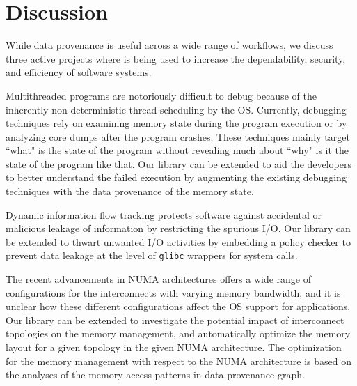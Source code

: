 \section{Discussion}
\label{sec:discussion}
While data provenance is useful across a wide range of workflows, we discuss three active projects where \projecttitle is being used to increase the dependability, security, and efficiency of software systems. 

 Multithreaded programs are notoriously difficult to debug because of the inherently non-deterministic thread scheduling by the OS.  Currently, debugging techniques rely on examining memory state during the program execution or by analyzing core dumps after the program crashes. These techniques mainly target ``what" is the state of the program without revealing much about ``why" is it the state of the program like that. Our library can be extended to aid the developers to better understand the failed execution by augmenting the existing debugging techniques with the data provenance of the memory state.


%
%
%


 Dynamic information flow tracking protects software against accidental or malicious leakage of information by restricting the spurious I/O. Our library can be extended to thwart unwanted I/O activities by embedding a policy checker to prevent data leakage at the level of {\tt glibc} wrappers for system calls.



 The recent advancements in NUMA architectures offers a wide range of configurations for the interconnects with varying memory bandwidth, and  it is unclear how these different configurations affect the OS support for applications. Our library can be extended to investigate the potential impact of interconnect topologies on the memory management, and automatically optimize the memory layout  for a given  topology in the given NUMA architecture.  The optimization for  the  memory management with respect to the NUMA architecture is based on the  analyses of the memory access patterns in data provenance graph.


